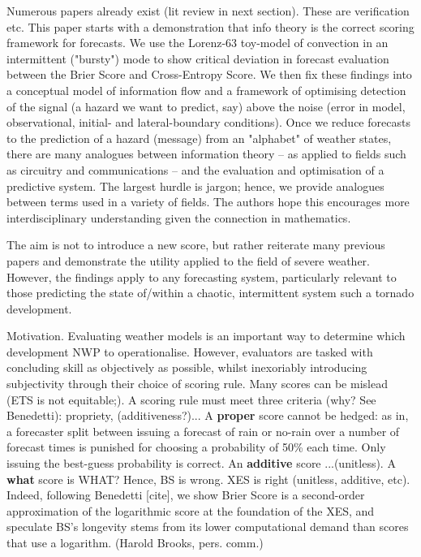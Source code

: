 \documentclass[draft]{ametsoc}
\begin{document}
Numerous papers already exist (lit review in next section). These are verification etc. This paper starts with a demonstration that info theory is the correct scoring framework for forecasts. We use the Lorenz-63 toy-model of convection in an intermittent ("bursty") mode to show critical deviation in forecast evaluation between the Brier Score and Cross-Entropy Score. We then fix these findings into a conceptual model of information flow and a framework of optimising detection of the signal (a hazard we want to predict, say) above the noise (error in model, observational, initial- and lateral-boundary conditions). Once we reduce forecasts to the prediction of a hazard (message) from an "alphabet" of weather states, there are many analogues between information theory -- as applied to fields such as circuitry and communications -- and the evaluation and optimisation of a predictive system. The largest hurdle is jargon; hence, we provide analogues between terms used in a variety of fields. The authors hope this encourages more interdisciplinary understanding given the connection in mathematics.

The aim is not to introduce a new score, but rather reiterate many previous papers and demonstrate the utility applied to the field of severe weather. However, the findings apply to any forecasting system, particularly relevant to those predicting the state of/within a chaotic, intermittent system such a tornado development.

Motivation. Evaluating weather models is an important way to determine which development NWP to operationalise. However, evaluators are tasked with concluding skill as objectively as possible, whilst inexoriably introducing subjectivity through their choice of scoring rule. Many scores can be mislead (ETS is not equitable;). A scoring rule must meet three criteria (why? See Benedetti): propriety, (additiveness?)... A \textbf{proper} score cannot be hedged: as in, a forecaster split between issuing a forecast of rain or no-rain over a number of forecast times is punished for choosing a probability of 50\% each time. Only issuing the best-guess probability is correct. An \textbf{additive} score ...(unitless). A \textbf{what} score is WHAT? Hence, BS is wrong. XES is right (unitless, additive, etc). Indeed, following Benedetti [cite], we show Brier Score is a second-order approximation of the logarithmic score at the foundation of the XES, and speculate BS's longevity stems from its lower computational demand than scores that use a logarithm. (Harold Brooks, pers. comm.)
\end{document}
